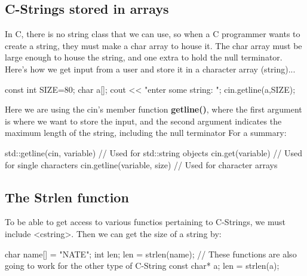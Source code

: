 \documentclass{report}
\begin{document}
    \pagebreak \bigbreak \noindent 
    \subsection{C-Strings stored in arrays}
    \bigbreak \noindent 
    In C, there is no string class that we can use, so when a C programmer wants to create a string, they must make a char array to house it. The char array must be large enough to house the string, and one extra to hold the null terminator.
    \bigbreak \noindent 
    Here's how we get input from a user and store it in a character array (string)...
    \bigbreak \noindent 
    
    \begin{cppcode}
const int SIZE=80;
char a[];
cout << "enter some string: ";
cin.getline(a,SIZE);
    \end{cppcode}
    
    \bigbreak \noindent 
    Here we are using the cin's member function \textbf{getline()}, where the first argument is where we want to store the input, and the second argument indicates the maximum length of the string, including the null terminator
    \bigbreak \noindent 
    For a summary:
    \bigbreak \noindent 
    
    \begin{cppcode}
std::getline(cin, variable) // Used for std::string objects
cin.get(variable) // Used for single characters
cin.getline(variable, size) // Used for character arrays
    \end{cppcode}
    
    \bigbreak \noindent 

    \bigbreak \noindent 
    \subsection{The Strlen function}
    \bigbreak \noindent 
    To be able to get access to various functios pertaining to C-Strings, we must include <cstring>. Then we can get the size of a string by:
    \bigbreak \noindent 
    
    \begin{cppcode}
char name[] = "NATE";
int len;
len = strlen(name);
// These functions are also going to work for the other type of C-String
const char* a;
len = strlen(a);
    \end{cppcode}
    
    \bigbreak \noindent 
\end{document}
